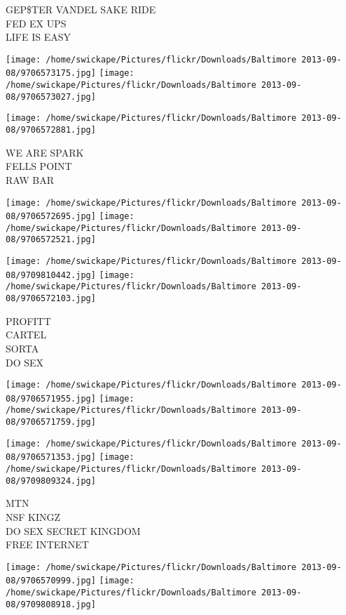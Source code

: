 \documentclass[10pt,letterpaper]{article}
\begin{document}
GEP\$TER VANDEL SAKE RIDE\\
FED EX UPS\\
LIFE IS EASY\\
\pagebreak

\texttt{[image: /home/swickape/Pictures/flickr/Downloads/Baltimore 2013-09-08/9706573175.jpg]}
\texttt{[image: /home/swickape/Pictures/flickr/Downloads/Baltimore 2013-09-08/9706573027.jpg]}

\vspace{0.25in}
\texttt{[image: /home/swickape/Pictures/flickr/Downloads/Baltimore 2013-09-08/9706572881.jpg]}

WE ARE SPARK\\
FELLS POINT\\
RAW BAR\\
\pagebreak

\texttt{[image: /home/swickape/Pictures/flickr/Downloads/Baltimore 2013-09-08/9706572695.jpg]}
\texttt{[image: /home/swickape/Pictures/flickr/Downloads/Baltimore 2013-09-08/9706572521.jpg]}

\texttt{[image: /home/swickape/Pictures/flickr/Downloads/Baltimore 2013-09-08/9709810442.jpg]}
\texttt{[image: /home/swickape/Pictures/flickr/Downloads/Baltimore 2013-09-08/9706572103.jpg]}

PROFITT\\
CARTEL\\
SORTA\\
DO SEX\\
\pagebreak

\texttt{[image: /home/swickape/Pictures/flickr/Downloads/Baltimore 2013-09-08/9706571955.jpg]}
\texttt{[image: /home/swickape/Pictures/flickr/Downloads/Baltimore 2013-09-08/9706571759.jpg]}

\texttt{[image: /home/swickape/Pictures/flickr/Downloads/Baltimore 2013-09-08/9706571353.jpg]}
\texttt{[image: /home/swickape/Pictures/flickr/Downloads/Baltimore 2013-09-08/9709809324.jpg]}

MTN\\
NSF KINGZ\\
DO SEX SECRET KINGDOM\\
FREE INTERNET\\
\pagebreak

\texttt{[image: /home/swickape/Pictures/flickr/Downloads/Baltimore 2013-09-08/9706570999.jpg]}
\texttt{[image: /home/swickape/Pictures/flickr/Downloads/Baltimore 2013-09-08/9709808918.jpg]}
\end{document}
